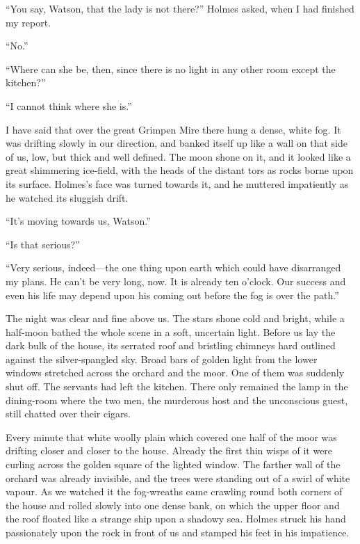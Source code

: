 \documentclass[paper=5.5in:8.5in,BCOR=7mm,twoside,DIV=calc,12pt,usegeometry,openany,chapterprefix,endperiod,headings=big]{scrbook} %
\begin{document}
\enquote{You say, Watson, that the lady is not there?} Holmes asked, when I had finished my report.

\enquote{No.}

\enquote{Where can she be, then, since there is no light in any other room except the kitchen?}

\enquote{I cannot think where she is.}

I have said that over the great Grimpen Mire there hung a dense, white fog. It was drifting slowly in our direction, and banked itself up like a wall on that side of us, low, but thick and well defined. The moon shone on it, and it looked like a great shimmering ice-field, with the heads of the distant tors as rocks borne upon its surface. Holmes's face was turned towards it, and he muttered impatiently as he watched its sluggish drift.

\enquote{It's moving towards us, Watson.}

\enquote{Is that serious?}

\enquote{Very serious, indeed---the one thing upon earth which could have disarranged my plans. He can't be very long, now. It is already ten o'clock. Our success and even his life may depend upon his coming out before the fog is over the path.}

The night was clear and fine above us. The stars shone cold and bright, while a half-moon bathed the whole scene in a soft, uncertain light. Before us lay the dark bulk of the house, its serrated roof and bristling chimneys hard outlined against the silver-spangled sky. Broad bars of golden light from the lower windows stretched across the orchard and the moor. One of them was suddenly shut off. The servants had left the kitchen. There only remained the lamp in the dining-room where the two men, the murderous host and the unconscious guest, still chatted over their cigars.

Every minute that white woolly plain which covered one half of the moor was drifting closer and closer to the house. Already the first thin wisps of it were curling across the golden square of the lighted window. The farther wall of the orchard was already invisible, and the trees were standing out of a swirl of white vapour. As we watched it the fog-wreaths came crawling round both corners of the house and rolled slowly into one dense bank, on which the upper floor and the roof floated like a strange ship upon a shadowy sea. Holmes struck his hand passionately upon the rock in front of us and stamped his feet in his impatience.
\end{document}
